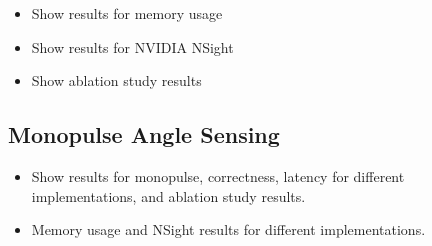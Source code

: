 \begin{itemize}
    \item Show results for memory usage
    \item Show results for NVIDIA NSight
    \item Show ablation study results 
\end{itemize}


\subsection{Monopulse Angle Sensing}
\begin{itemize}
    \item Show results for monopulse, correctness, latency for different implementations, and ablation study results. 
    \item Memory usage and NSight results for different implementations.
\end{itemize}